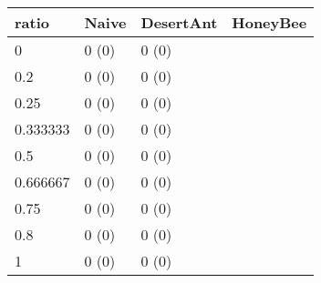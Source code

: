 \begin{tabular} {|l|l|l|l|}
\hline
ratio & Naive & DesertAnt & HoneyBee \\
\hline
0 & 0 (0)  & 0 (0)  &  \\
0.2 & 0 (0)  & 0 (0)  &  \\
0.25 & 0 (0)  & 0 (0)  &  \\
0.333333 & 0 (0)  & 0 (0)  &  \\
0.5 & 0 (0)  & 0 (0)  &  \\
0.666667 & 0 (0)  & 0 (0)  &  \\
0.75 & 0 (0)  & 0 (0)  &  \\
0.8 & 0 (0)  & 0 (0)  &  \\
1 & 0 (0)  & 0 (0)  &  \\
\hline
\end{tabular}
